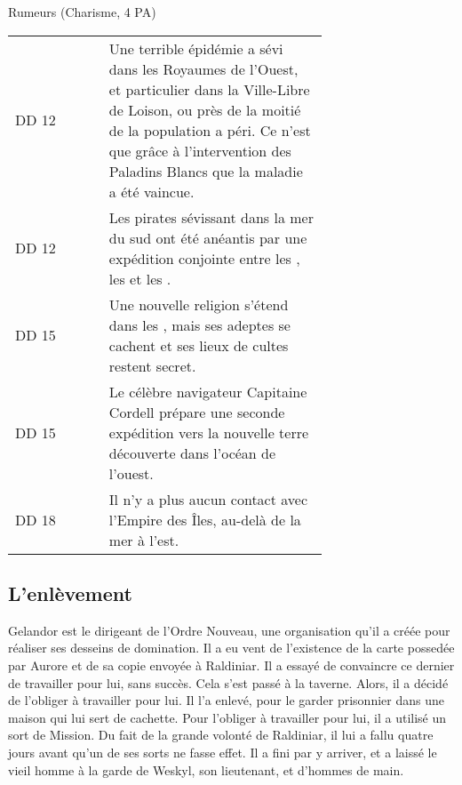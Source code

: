 \documentclass[a4paper,10pt,openany]{book}
\begin{document}
\begin{multicols}{2}
\begin{quotebox}
	Rumeurs (Charisme, 4 PA)\par\noindent
	\begin{tabular}{lp{0.7\linewidth}}
		DD 12 & Une terrible épidémie a sévi dans les Royaumes de l’Ouest, et particulier dans la Ville-Libre de Loison, ou près de la moitié de la
		population a péri. Ce n’est que grâce à l’intervention des Paladins Blancs que la maladie a été vaincue.\\
		DD 12 & Les pirates sévissant dans la mer du sud ont été anéantis par une expédition conjointe entre les \Royaumes, les \Elfes et les \Nains.\\
		DD 15 & Une nouvelle religion s’étend dans les \Royaumes, mais ses adeptes se cachent et ses lieux de cultes restent secret.\\
		DD 15 & Le célèbre navigateur Capitaine Cordell prépare une seconde expédition vers la nouvelle terre découverte dans l’océan de l’ouest.\\
		DD 18 & Il n’y a plus aucun contact avec l’Empire des Îles, au-delà de la mer à l’est.
	\end{tabular}
\end{quotebox}

\subsection{L’enlèvement}
Gelandor est le dirigeant de l’Ordre Nouveau, une organisation qu’il a créée pour réaliser ses desseins de domination. Il a eu vent de l’existence de
la carte possedée par Aurore et de sa copie envoyée à Raldiniar. Il a essayé de convaincre ce dernier de travailler pour lui, sans succès. Cela s’est
passé à la taverne. Alors, il a décidé de l’obliger à travailler pour lui. Il l’a enlevé, pour le garder prisonnier dans une maison qui lui sert de
cachette. Pour l’obliger à travailler pour lui, il a utilisé un sort de Mission. Du fait de la grande volonté de Raldiniar, il lui a fallu quatre
jours avant qu’un de ses sorts ne fasse effet. Il a fini par y arriver, et a laissé le vieil homme à la garde de Weskyl, son lieutenant, et d’hommes
de main.


\end{multicols}
\end{document}
